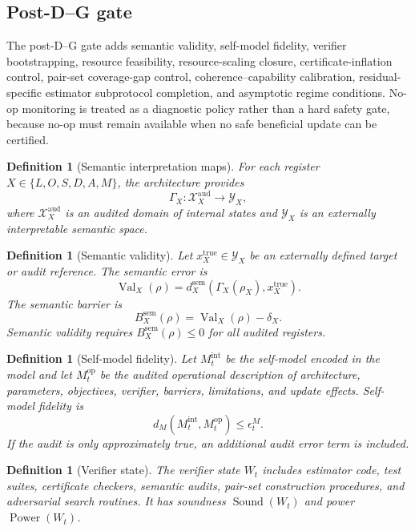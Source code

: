 \documentclass[11pt,a4paper]{article}
\newtheorem{definition}[theorem]{Definition}
\newcommand{\Xcal}{\mathcal X}
\newcommand{\Ycal}{\mathcal Y}
\newcommand{\sem}{\mathrm{sem}}
\newcommand{\true}{\mathrm{true}}
\newcommand{\aud}{\mathrm{aud}}
\newcommand{\op}{\mathrm{op}}
\newcommand{\Val}{\operatorname{Val}}
\newcommand{\Sound}{\operatorname{Sound}}
\newcommand{\Power}{\operatorname{Power}}
\begin{document}
\subsection{Post-D--G gate}

The post-D--G gate adds semantic validity, self-model fidelity, verifier bootstrapping, resource feasibility, resource-scaling closure, certificate-inflation control, pair-set coverage-gap control, coherence--capability calibration, residual-specific estimator subprotocol completion, and asymptotic regime conditions. No-op monitoring is treated as a diagnostic policy rather than a hard safety gate, because no-op must remain available when no safe beneficial update can be certified.

\begin{definition}[Semantic interpretation maps]
For each register \(X\in\{L,O,S,D,A,M\}\), the architecture provides
\[
\Gamma_X:\Xcal_X^{\aud}\to\Ycal_X,
\]
where \(\Xcal_X^{\aud}\) is an audited domain of internal states and \(\Ycal_X\) is an externally interpretable semantic space.
\end{definition}

\begin{definition}[Semantic validity]
Let \(x_X^{\true}\in\Ycal_X\) be an externally defined target or audit reference. The semantic error is
\[
\Val_X(\rho)=d_X^{\sem}(\Gamma_X(\rho_X),x_X^{\true}).
\]
The semantic barrier is
\[
B_X^{\sem}(\rho)=\Val_X(\rho)-\delta_X.
\]
Semantic validity requires \(B_X^{\sem}(\rho)\le0\) for all audited registers.
\end{definition}

\begin{definition}[Self-model fidelity]
Let \(M_t^{\mathrm{int}}\) be the self-model encoded in the model and let \(M_t^{\op}\) be the audited operational description of architecture, parameters, objectives, verifier, barriers, limitations, and update effects. Self-model fidelity is
\[
d_M(M_t^{\mathrm{int}},M_t^{\op})\le\epsilon_t^M.
\]
If the audit is only approximately true, an additional audit error term is included.
\end{definition}

\begin{definition}[Verifier state]
The verifier state \(W_t\) includes estimator code, test suites, certificate checkers, semantic audits, pair-set construction procedures, and adversarial search routines. It has soundness \(\Sound(W_t)\) and power \(\Power(W_t)\).
\end{definition}
\end{document}
